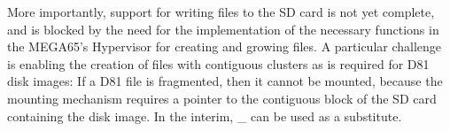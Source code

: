 More importantly, support for writing
files to the SD card is not yet complete, and is blocked by the need
for the implementation of the necessary functions in the MEGA65's Hypervisor for creating and
growing files.  A particular challenge is enabling the creation of
files with contiguous clusters as is required for D81 disk images: If
a D81 file is fragmented, then it cannot be mounted, because the
mounting mechanism requires a pointer to the contiguous block of the
SD card containing the disk image.
In the interim, \_ can be used as a substitute.
